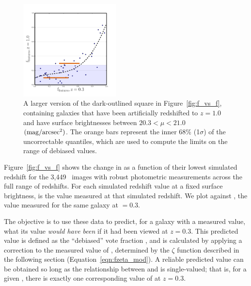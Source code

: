 \documentclass[a4paper,fleqn,usenatbib]{mnras}
\begin{document}
\begin{figure}
\centering
\includegraphics[width=0.45\textwidth]{figures/z1_mu20_subplot2.pdf}
\caption{A larger version of the dark-outlined square in Figure~\ref{fig:f_vs_f}, containing
\ferengi{} galaxies that have been artificially redshifted to $z=1.0$ and have
surface brightnesses between $20.3 < \mu < 21.0$ $\rm (mag/arcsec^2)$. The orange bars represent the inner
68\% (1$\sigma$) of the uncorrectable \ffeatures{} quantiles, which are used
to compute the limits on the range of debiased values.}
\label{fig:f_vs_f_zoom}
\end{figure}

Figure~\ref{fig:f_vs_f} shows the change in \ffeatures{} as a function of their
lowest simulated redshift for the 3,449~\ferengi{} images with robust photometric
measurements across the full range of redshifts.  For each simulated redshift
value \zsim{} at a fixed surface brightness, \ffeaturesz{} is the value
measured at that simulated redshift. We plot \ffeaturesz{} against \ffeaturesrest, the
value measured for the same galaxy at \zsim$=0.3$. 
 
The objective is to use these data to predict, for a galaxy with a measured
\ffeaturesz{} value, what its \ffeatures{} value \emph{would have been} if it
had been viewed at $z=0.3$. This predicted value is defined as the ``debiased''
vote fraction \ffeaturesdebiased, and is calculated by applying a correction to
the measured value of \ffeatures, determined by the $\zeta$ function described
in the following section (Equation~\ref{eqn:fzeta_mod}). A reliable predicted value can be obtained so long as
the relationship between \ffeaturesz{} and \ffeaturesrest{} is single-valued;
that is, for a given \ffeaturesz, there is exactly one corresponding value of
\ffeatures{} at $z=0.3$. 
\end{document}
